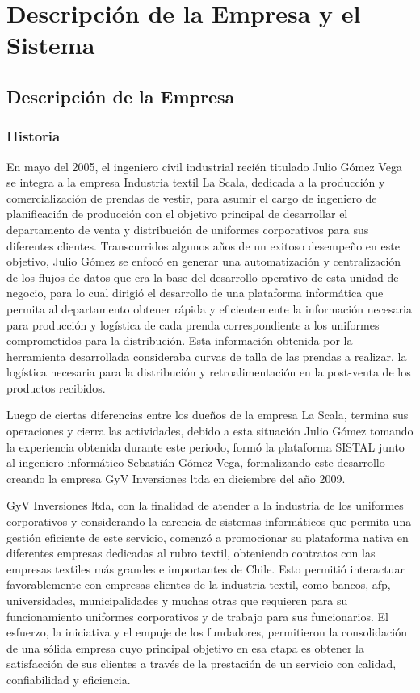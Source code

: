 \chapter{Descripción de la Empresa y el Sistema}

\section{Descripción de la Empresa}

\subsection{Historia}

En mayo del 2005, el ingeniero civil industrial recién titulado Julio Gómez Vega se integra a la empresa Industria textil La Scala, dedicada a la producción y comercialización de prendas de vestir, para asumir el cargo de ingeniero de planificación de producción con el objetivo principal de desarrollar el departamento de venta y distribución de uniformes corporativos para sus diferentes clientes. Transcurridos algunos años de un exitoso desempeño en este objetivo, Julio Gómez se enfocó en generar una automatización y centralización de los flujos de datos que era la base del desarrollo operativo de esta unidad de negocio, para lo cual dirigió el desarrollo de una plataforma informática que permita al departamento obtener rápida y eficientemente la información necesaria para producción y logística de cada prenda correspondiente a los uniformes comprometidos para la distribución. Esta información obtenida por la herramienta desarrollada consideraba curvas de talla de las prendas a realizar, la logística necesaria para la distribución y retroalimentación en la post-venta de los productos recibidos.

Luego de ciertas diferencias entre los dueños de la empresa La Scala, termina sus operaciones y cierra las actividades, debido a esta situación Julio Gómez tomando la experiencia obtenida durante este periodo, formó la plataforma SISTAL junto al ingeniero informático Sebastián Gómez Vega, formalizando este desarrollo creando la empresa GyV Inversiones ltda en diciembre del año 2009.

GyV Inversiones ltda, con la finalidad de atender a la industria de los uniformes corporativos y considerando la carencia de sistemas informáticos que permita una gestión eficiente de este servicio, comenzó a promocionar su plataforma nativa en diferentes empresas dedicadas al rubro textil, obteniendo contratos con las empresas textiles más grandes e importantes de Chile. Esto permitió interactuar favorablemente con empresas clientes de la industria textil, como bancos, afp, universidades, municipalidades y muchas otras que requieren para su funcionamiento uniformes corporativos y de trabajo para sus funcionarios. El esfuerzo, la iniciativa y el empuje de los fundadores, permitieron la consolidación de una sólida empresa cuyo principal objetivo en esa etapa es obtener la satisfacción de sus clientes a través de la prestación de un servicio con calidad, confiabilidad y eficiencia.

